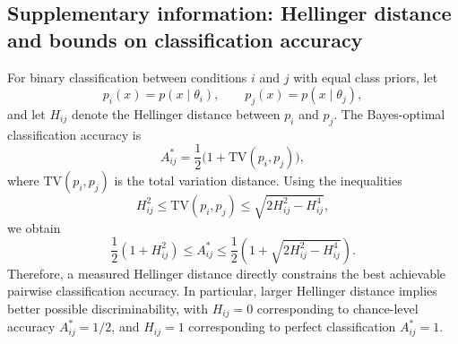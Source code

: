 \subsection{Supplementary information: Hellinger distance and bounds on classification accuracy}

For binary classification between conditions \(i\) and \(j\) with equal class priors, let
\[
p_i(x)=p(x\mid \theta_i),\qquad p_j(x)=p(x\mid \theta_j),
\]
and let \(H_{ij}\) denote the Hellinger distance between \(p_i\) and \(p_j\). The Bayes-optimal classification accuracy is
\[
A^*_{ij}=\frac12\bigl(1+\mathrm{TV}(p_i,p_j)\bigr),
\]
where \(\mathrm{TV}(p_i,p_j)\) is the total variation distance. Using the inequalities
\[
H_{ij}^2 \le \mathrm{TV}(p_i,p_j)\le \sqrt{2H_{ij}^2-H_{ij}^4},
\]
we obtain
\[
\frac12(1+H_{ij}^2)
\le
A^*_{ij}
\le
\frac12\left(1+\sqrt{2H_{ij}^2-H_{ij}^4}\right).
\]
Therefore, a measured Hellinger distance directly constrains the best achievable pairwise classification accuracy. In particular, larger Hellinger distance implies better possible discriminability, with \(H_{ij}=0\) corresponding to chance-level accuracy \(A^*_{ij}=1/2\), and \(H_{ij}=1\) corresponding to perfect classification \(A^*_{ij}=1\).